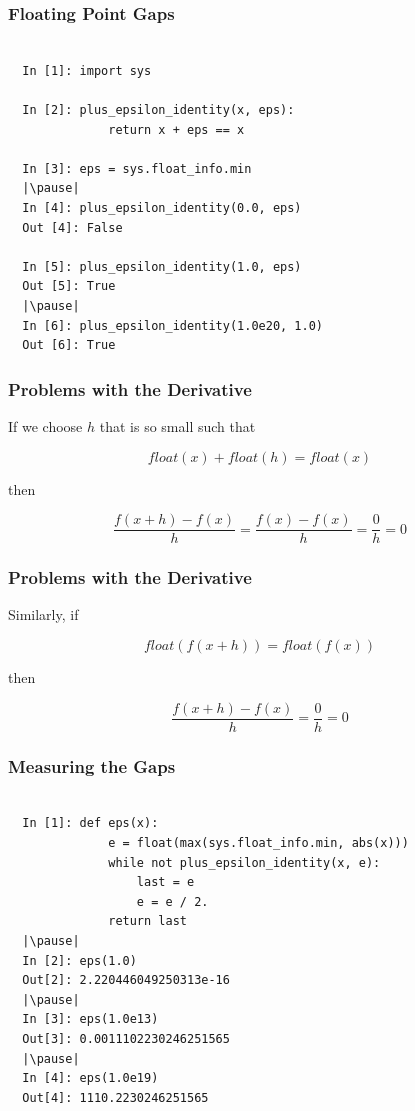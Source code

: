 \documentclass{beamer}
\begin{document}
\begin{frame}[fragile]
\frametitle{Floating Point Gaps}

\begin{lstlisting}

  In [1]: import sys

  In [2]: plus_epsilon_identity(x, eps):
              return x + eps == x

  In [3]: eps = sys.float_info.min
  |\pause|
  In [4]: plus_epsilon_identity(0.0, eps)
  Out [4]: False

  In [5]: plus_epsilon_identity(1.0, eps)
  Out [5]: True
  |\pause|
  In [6]: plus_epsilon_identity(1.0e20, 1.0)
  Out [6]: True

\end{lstlisting}

\end{frame}

\begin{frame}
\frametitle{Problems with the Derivative}

If we choose $h$ that is so small such that

\[ float(x) + float(h) = float(x) \]
\pause

then

\[ \frac{f(x+h) - f(x)}{h} = \frac{f(x) - f(x)}{h} = \frac{0}{h} = 0 \]

\end{frame}

\begin{frame}
\frametitle{Problems with the Derivative}

Similarly, if

\[ float(f(x+h)) = float(f(x))  \]
\pause

then

\[ \frac{f(x+h) - f(x)}{h} = \frac{0}{h} = 0 \]

\end{frame}


\begin{frame}[fragile]
\frametitle{Measuring the Gaps}

\begin{lstlisting}

  In [1]: def eps(x):
              e = float(max(sys.float_info.min, abs(x)))
              while not plus_epsilon_identity(x, e):
                  last = e
                  e = e / 2.
              return last
  |\pause|
  In [2]: eps(1.0)
  Out[2]: 2.220446049250313e-16
  |\pause|
  In [3]: eps(1.0e13)
  Out[3]: 0.0011102230246251565
  |\pause|
  In [4]: eps(1.0e19)
  Out[4]: 1110.2230246251565
\end{lstlisting}

\end{frame}
\end{document}

